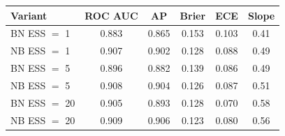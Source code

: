\begin{tabular}{lccccc}
\toprule
Variant & ROC AUC & AP & Brier & ECE & Slope \\
\midrule
BN ESS $=$ 1 & 0.883 & 0.865 & 0.153 & 0.103 & 0.41 \\
NB ESS $=$ 1 & 0.907 & 0.902 & 0.128 & 0.088 & 0.49 \\
BN ESS $=$ 5 & 0.896 & 0.882 & 0.139 & 0.086 & 0.49 \\
NB ESS $=$ 5 & 0.908 & 0.904 & 0.126 & 0.087 & 0.51 \\
BN ESS $=$ 20 & 0.905 & 0.893 & 0.128 & 0.070 & 0.58 \\
NB ESS $=$ 20 & 0.909 & 0.906 & 0.123 & 0.080 & 0.56 \\
\bottomrule
\end{tabular}

